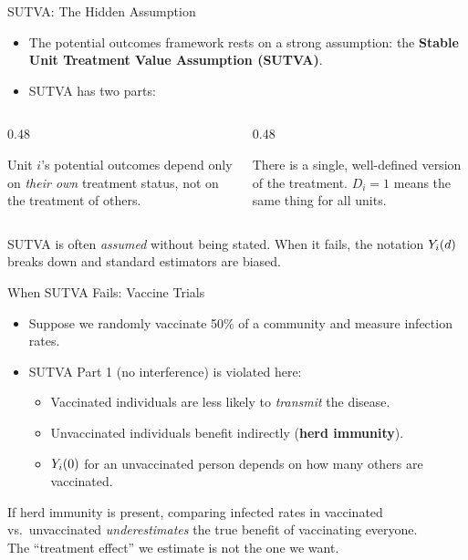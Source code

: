 \documentclass[aspectratio=169, 11pt]{beamer}
\begin{document}
\begin{frame}[t]{SUTVA: The Hidden Assumption}
\begin{itemize}
  \setlength\itemsep{0.5em}
  \item The potential outcomes framework rests on a strong assumption:
        the \textbf{Stable Unit Treatment Value Assumption (SUTVA)}.
  \item SUTVA has two parts:
\end{itemize}
\vspace{0.4em}
\begin{columns}[T]
\begin{column}{0.48\textwidth}
  \begin{keybox}
    Unit $i$'s potential outcomes depend only on \emph{their own} treatment status,
    not on the treatment of others.
  \end{keybox}
\end{column}
\begin{column}{0.48\textwidth}
  \begin{keybox}
    There is a single, well-defined version of the treatment.
    $D_i = 1$ means the same thing for all units.
  \end{keybox}
\end{column}
\end{columns}
\vspace{0.5em}
\begin{warningbox}
SUTVA is often \emph{assumed} without being stated. When it fails,
the notation $Y_{i}(d)$ breaks down and standard estimators are biased.
\end{warningbox}
\end{frame}

\begin{frame}[t]{When SUTVA Fails: Vaccine Trials}
\begin{itemize}
  \setlength\itemsep{0.5em}
  \item Suppose we randomly vaccinate 50\% of a community and measure infection rates.
  \item SUTVA Part 1 (no interference) is violated here:
    \begin{itemize}
      \item Vaccinated individuals are less likely to \emph{transmit} the disease.
      \item Unvaccinated individuals benefit indirectly (\textbf{herd immunity}).
      \item $Y_{i}(0)$ for an unvaccinated person depends on how many others are vaccinated.
    \end{itemize}
\end{itemize}
\vspace{0.4em}
\begin{examplebox}[Consequence]
If herd immunity is present, comparing infected rates in vaccinated vs.\ unvaccinated
\emph{underestimates} the true benefit of vaccinating everyone.\\[0.3em]
The ``treatment effect'' we estimate is not the one we want.
\end{examplebox}
\end{frame}
\end{document}
